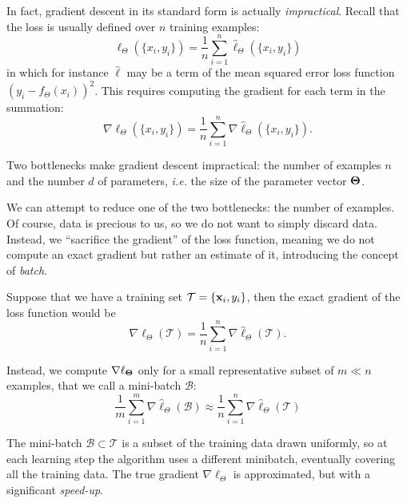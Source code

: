 In fact, gradient descent in its standard form is actually \emph{impractical}. Recall that the loss is usually defined over $n$ training examples:
\begin{equation}
    \ell_\Theta ( \{ x_i, y_i\}) = \frac{1}{n}\sum_{i=1}^n \hat{\ell}_\Theta  ( \{ x_i, y_i\})
\end{equation}
in which for instance $\hat{\ell}$ may be a term of the mean squared error loss function $(y_i - f_\Theta(x_i))^2$. This requires computing the gradient for each term in the summation:
\begin{equation}
\nabla \ell_\Theta ( \{ x_i, y_i\}) = \frac{1}{n}\sum_{i=1}^n \nabla \hat{\ell}_\Theta  ( \{ x_i, y_i\}).
\end{equation}

Two bottlenecks make gradient descent impractical: the number of examples $n$ and the number $d$ of parameters, \textit{i.e.} the size of the parameter vector $\vb*{\Theta}$.

We can attempt to reduce one of the two bottlenecks: the number of examples. Of course, data is precious to us, so we do not want to simply discard data. Instead, we ``sacrifice the gradient'' of the loss function, meaning we do not compute an exact gradient but rather an estimate of it, introducing the concept of \emph{batch}.

Suppose that we have a training set $\mathcal{T} = \{ \vb{x}_i, y_i \}$, then the exact gradient of the loss function would be
\[ 
    \nabla \ell_\Theta ( \mathcal{T}) = \frac{1}{n}\sum_{i=1}^n \nabla \hat{\ell}_\Theta  ( \mathcal{T}) .
\]

Instead, we compute $\nabla \ell_{\vb*{\Theta}}$ only for a small representative subset of $m \ll n$ examples, that we call a mini-batch $\mathcal{B}$:
\begin{equation}
    \frac{1}{m}\sum_{i=1}^m \nabla\hat{\ell}_\Theta(\mathcal{B}) \approx \frac{1}{n}\sum_{i=1}^n \nabla \hat{\ell}_\Theta  ( \mathcal{T})
\end{equation}

The mini-batch $\mathcal{B}\subset\mathcal{T}$ is a subset of the training data drawn uniformly, so at each learning step the algorithm uses a different minibatch, eventually covering all the training data. The true gradient $\nabla\ell_\Theta$ is approximated, but with a significant \emph{speed-up}. 

